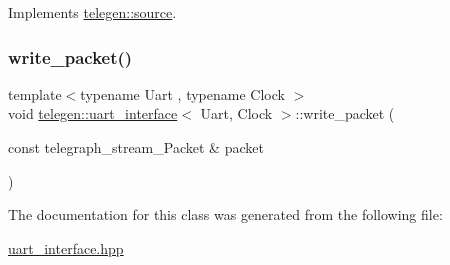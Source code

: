 Implements \hyperlink{classtelegen_1_1source_a224b4eb02ea346aca099615a5ae00ea9}{telegen\+::source}.

\mbox{\label{classtelegen_1_1uart__interface_af9ddca9952736ea442f0324cac0c1087}} 
\subsubsection{\texorpdfstring{write\+\_\+packet()}{write\_packet()}}
{\footnotesize\ttfamily template$<$typename Uart , typename Clock $>$ \\
void \hyperlink{classtelegen_1_1uart__interface}{telegen\+::uart\+\_\+interface}$<$ Uart, Clock $>$\+::write\+\_\+packet (\begin{DoxyParamCaption}\item[{const telegraph\+\_\+stream\+\_\+\+Packet \&}]{packet }\end{DoxyParamCaption})\hspace{0.3cm}{\ttfamily [inline]}}



The documentation for this class was generated from the following file\+:\begin{DoxyCompactItemize}
\item 
\hyperlink{uart__interface_8hpp}{uart\+\_\+interface.\+hpp}\end{DoxyCompactItemize}

